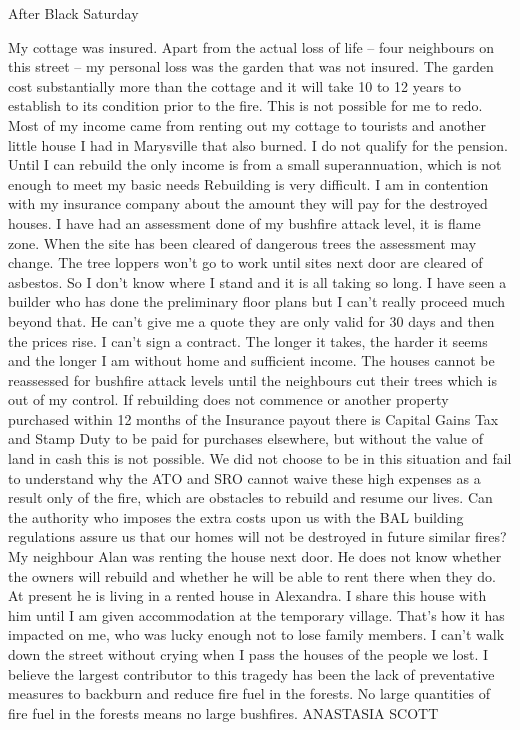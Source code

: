 \documentclass[a4paper]{article}
\begin{document}
    After Black Saturday

    My cottage was insured. Apart from the actual loss of life – four neighbours on this street – my personal loss was the garden that was not insured. The garden cost substantially more than the cottage and it will take 10 to 12 years to establish to its condition prior to the fire. This is not possible for me to redo.
    Most of my income came from renting out my cottage to tourists and another little house I had in Marysville that also burned. I do not qualify for the pension. Until I can rebuild the only income is from a small superannuation, which is not enough to meet my basic needs
    Rebuilding is very difficult. I am in contention with my insurance company about the amount they will pay for the destroyed houses. I have had an assessment done of my bushfire attack level, it is flame zone. When the site has been cleared of dangerous trees the assessment may change. The tree loppers won't go to work until sites next door are cleared of asbestos. So I don't know where I stand and it is all taking so long. I have seen a builder who has done the preliminary floor plans but I can't really proceed much beyond that. He can't give me a quote they are only valid for 30 days and then the prices rise. I can't sign a contract. The longer it takes, the harder it seems and the longer I am without home and sufficient income. The houses cannot be reassessed for bushfire attack levels until the neighbours cut their trees which is out of my control. If rebuilding does not commence or another property purchased within 12 months of the Insurance payout there is Capital Gains Tax and Stamp Duty to be paid for purchases elsewhere, but without the value of land in cash this is not possible. We did not choose to be in this situation and fail to understand why the ATO and SRO cannot waive these high expenses as a result only of the fire, which are obstacles to rebuild and resume our lives. Can the authority who imposes the extra costs upon us with the BAL building regulations assure us that our homes will not be destroyed in future similar fires?
    My neighbour Alan was renting the house next door. He does not know whether the owners will rebuild and whether he will be able to rent there when they do. At present he is living in a rented house in Alexandra. I share this house with him until I am given accommodation at the temporary village.
    That's how it has impacted on me, who was lucky enough not to lose family members. I can't walk down the street without crying when I pass the houses of the people we lost.
    I believe the largest contributor to this tragedy has been the lack of preventative measures to backburn and reduce fire fuel in the forests. No large quantities of fire fuel in the forests means no large bushfires.
    \newline
    \newline
    ANASTASIA SCOTT
\end{document}
